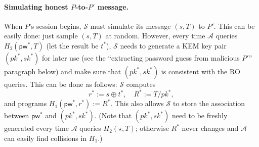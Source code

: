 \documentclass{article}
\theoremstyle{plain}
\theoremstyle{definition}
\theoremstyle{remark}
\newcommand{\adv}{\mathcal{A}}
\renewcommand{\sim}{\mathcal{S}}
\newcommand{\pw}{\mathsf{pw}}
\begin{document}
\paragraph{Simulating honest $P$-to-$P'$ message.}
When $P$'s session begins, $\sim$ must simulate its message $(s,T)$ to $P'$. This can be easily done: just sample $(s,T)$ at random. However, every time $\adv$ queries $H_2(\pw^*,T)$ (let the result be $t^*$), $\sim$ needs to generate a KEM key pair $(pk^*,sk^*)$ for later use (see the ``extracting password guess from malicious $P'$'' paragraph below) and make sure that $(pk^*,sk^*)$ is consistent with the RO queries. This can be done as follows: $\sim$ computes
\[
r^* := s \oplus t^*, \quad R^* := T/pk^*,
\]
and programs $H_1(\pw^*,r^*) := R^*$. This also allows $\sim$ to store the association between $\pw^*$ and $(pk^*,sk^*)$. (Note that $(pk^*,sk^*)$ need to be freshly generated every time $\adv$ queries $H_2(\star,T)$; otherwise $R^*$ never changes and $\adv$ can easily find collisions in $H_1$.)
\end{document}

